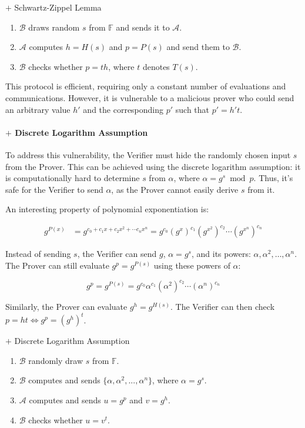 \documentclass{article}
\begin{document}
\begin{protocol}{$+$ Schwartz-Zippel Lemma}{}
    \begin{enumerate}
    \item $\mathcal{B}$ draws random $s$ from $\mathbb{F}$ and sends it to $\mathcal{A}$.
    \item $\mathcal{A}$ computes $h = H(s)$ and $p = P(s)$ and send them to $\mathcal{B}$.
    \item $\mathcal{B}$ checks whether $p = t h$, where $t$ denotes $T(s)$.
\end{enumerate}
\end{protocol}

This protocol is efficient, requiring only a constant number of evaluations and communications. However, it is vulnerable to a malicious prover who could send an arbitrary value $h'$ and the corresponding $p'$ such that $p' = h't$.

\paragraph{$+$ Discrete Logarithm Assumption}

To address this vulnerability, the Verifier must hide the randomly chosen input $s$ from the Prover. This can be achieved using the discrete logarithm assumption: it is computationally hard to determine $s$ from $\alpha$, where $\alpha = g^s \bmod p$. Thus, it's safe for the Verifier to send $\alpha$, as the Prover cannot easily derive $s$ from it.

An interesting property of polynomial exponentiation is:

\begin{align}
    g^{P(x)} &= g^{c_0 + c_1 x + c_2 x^{2} + \cdots c_n x^{n}} = g^{c_0} (g^{x})^{c_1}  (g^{x^2})^{c_2} \cdots (g^{x^n})^{c_n}
\end{align}

Instead of sending $s$, the Verifier can send $g$, $\alpha = g^s$, and its powers: $\alpha, \alpha^2, \ldots, \alpha^n$. The Prover can still evaluate $g^p = g^{P(s)}$ using these powers of $\alpha$:

\begin{equation}
    g^{p} = g^{P(s)} = g^{c_0} \alpha^{c_1} (\alpha^{2})^{c_2} \cdots (\alpha^{n})^{c_n}
\end{equation}

Similarly, the Prover can evaluate $g^h = g^{H(s)}$. The Verifier can then check $p = ht \iff g^p = (g^h)^t$.

\begin{protocol}{$+$ Discrete Logarithm Assumption}{}
\begin{enumerate}
    \item $\mathcal{B}$ randomly draw $s$ from $\mathbb{F}$.
    \item $\mathcal{B}$ computes and sends $\{\alpha, \alpha^2, ..., \alpha^{n}\}$, where $\alpha = g^{s}$.
    \item $\mathcal{A}$ computes and sends $u = g^{p}$ and $v = g^{h}$.
    \item $\mathcal{B}$ checks whether $u = v^{t}$.
\end{enumerate}
\end{protocol}
\end{document}
